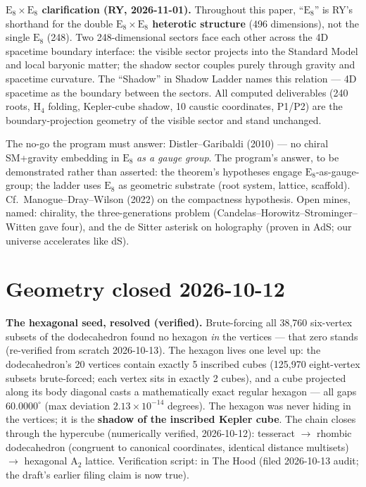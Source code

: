 \documentclass{alienfolio}
\begin{document}
\textbf{$\mathrm{E}_8\times\mathrm{E}_8$ clarification (RY,
2026-11-01).} Throughout this paper, ``$\mathrm{E}_8$'' is RY's
shorthand for the double \textbf{$\mathrm{E}_8\times\mathrm{E}_8$
heterotic structure} (496 dimensions), not the single $\mathrm{E}_8$
(248). Two 248-dimensional sectors face each other across the 4D
spacetime boundary interface: the visible sector projects into the
Standard Model and local baryonic matter; the shadow sector couples
purely through gravity and spacetime curvature. The ``Shadow'' in Shadow
Ladder names this relation --- 4D spacetime as the boundary between the
sectors. All computed deliverables (240 roots, $\mathrm{H}_4$ folding,
Kepler-cube shadow, 10 caustic coordinates, P1/P2) are the
boundary-projection geometry of the visible sector and stand unchanged.

The no-go the program must answer: Distler--Garibaldi (2010) --- no
chiral SM+gravity embedding in $\mathrm{E}_8$ \emph{as a gauge group}.
The program's answer, to be demonstrated rather than asserted: the
theorem's hypotheses engage $\mathrm{E}_8$-as-gauge-group; the ladder
uses $\mathrm{E}_8$ as geometric substrate (root system, lattice,
scaffold). Cf.\ Manogue--Dray--Wilson (2022) on the compactness
hypothesis. Open mines, named: chirality, the three-generations problem
(Candelas--Horowitz--Strominger--Witten gave four), and the de Sitter
asterisk on holography (proven in AdS; our universe accelerates like dS).

\section{Geometry closed 2026-10-12}
\label{sec:geometry}

\textbf{The hexagonal seed, resolved (verified).} Brute-forcing all 38,760
six-vertex subsets of the dodecahedron found no hexagon \emph{in} the
vertices --- that zero stands (re-verified from scratch 2026-10-13). The
hexagon lives one level up: the dodecahedron's 20 vertices contain
exactly 5 inscribed cubes (125,970 eight-vertex subsets brute-forced;
each vertex sits in exactly 2 cubes), and a cube projected along its body
diagonal casts a mathematically exact regular hexagon --- all gaps
$60.0000^\circ$ (max deviation $2.13\times10^{-14}$ degrees). The
hexagon was never hiding in the vertices; it is the \textbf{shadow of
the inscribed Kepler cube}. The chain closes through the hypercube (numerically verified, 2026-10-12): tesseract $\to$ rhombic dodecahedron (congruent to
canonical coordinates, identical distance multisets) $\to$ hexagonal
$\mathrm{A}_2$ lattice. Verification script:
in The Hood (filed 2026-10-13 audit; the draft's earlier filing claim is
now true).
\end{document}
